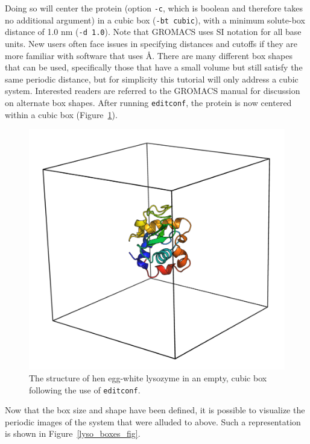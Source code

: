 \documentclass[9pt,tutorial,pubversion]{livecoms}
\begin{document}
Doing so will center the protein (option \texttt{-c}, which is boolean and therefore takes no additional argument) in a cubic box (\texttt{-bt cubic}), with a minimum solute-box distance of 1.0 nm (\texttt{-d 1.0}). Note that GROMACS uses SI notation for all base units. New users often face issues in specifying distances and cutoffs if they are more familiar with software that uses \AA. There are many different box shapes that can be used, specifically those that have a small volume but still satisfy the same periodic distance, but for simplicity this tutorial will only address a cubic system. Interested readers are referred to the GROMACS manual for discussion on alternate box shapes. After running \texttt{editconf}, the protein is now centered within a cubic box (Figure~\ref{lyso_box_fig}).

\begin{figure}[H]
\centering
\includegraphics{1AKI_1box}
\caption{The structure of hen egg-white lysozyme in an empty, cubic box following the use of \texttt{editconf}.}
\label{lyso_box_fig}
\end{figure}

Now that the box size and shape have been defined, it is possible to visualize the periodic images of the system that were alluded to above. Such a representation is shown in Figure~\ref{lyso_boxes_fig}.
\end{document}
